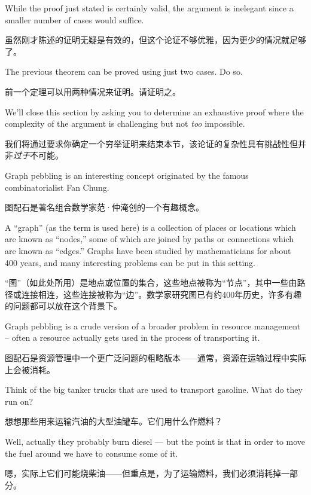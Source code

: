 While the proof just stated is certainly valid, the argument is inelegant
since a smaller number of cases would suffice.

虽然刚才陈述的证明无疑是有效的，但这个论证不够优雅，因为更少的情况就足够了。

\begin{exer}
The previous theorem can be proved using just two cases.  Do so.

前一个定理可以用两种情况来证明。请证明之。
\end{exer}

We'll close this section by asking you to determine an exhaustive proof where 
the complexity of the argument is challenging but not \emph{too} impossible.

我们将通过要求你确定一个穷举证明来结束本节，该论证的复杂性具有挑战性但并非\emph{过于}不可能。

 Graph pebbling is an interesting concept originated 
by the famous combinatorialist  Fan Chung.

图配石是著名组合数学家范·仲淹创的一个有趣概念。

A ``graph'' 
(as the term is used here) is a collection
of places or locations which are known as ``nodes,'' some of which 
are joined by paths or connections which are known as ``edges.'' 
Graphs have been studied by mathematicians for about 400 years, and 
many interesting problems can be put in this setting.

“图”（如此处所用）是地点或位置的集合，这些地点被称为“节点”，其中一些由路径或连接相连，这些连接被称为“边”。数学家研究图已有约400年历史，许多有趣的问题都可以放在这个背景下。

Graph pebbling
is a crude version of a broader problem in resource management -- often
a resource actually gets used in the process of transporting it.

图配石是资源管理中一个更广泛问题的粗略版本——通常，资源在运输过程中实际上会被消耗。

Think of
the big tanker trucks that are used to transport gasoline.  What do they
run on?

想想那些用来运输汽油的大型油罐车。它们用什么作燃料？

Well, actually they probably burn diesel --- but the point is
that in order to move the fuel around we have to consume some of it.

嗯，实际上它们可能烧柴油——但重点是，为了运输燃料，我们必须消耗掉一部分。

